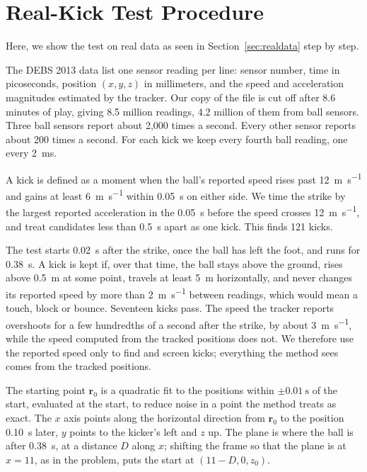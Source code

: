 \documentclass[10pt,a4paper]{article}
\begin{document}
\section{Real-Kick Test Procedure}
\label{app:realdata}

Here, we show the test on real data as seen in Section~\ref{sec:realdata} step by step.

The DEBS 2013 data \citep{debs2013} list one sensor reading
per line: sensor number, time in picoseconds, position $(x, y, z)$ in
millimeters, and the speed and acceleration magnitudes estimated by the
tracker. Our copy of the file is cut off after 8.6 minutes of play, giving
8.5 million readings, 4.2 million of them from ball sensors. Three ball
sensors report about 2{,}000 times a second. Every other sensor reports
about 200 times a second. For each kick we keep every fourth ball reading,
one every \SI{2}{\milli\second}.

A kick is defined as a moment when the ball's reported speed
rises past \SI{12}{\metre\per\second} and gains at least
\SI{6}{\metre\per\second} within \SI{0.05}{\second} on either side. We time
the strike by the largest reported acceleration in the \SI{0.05}{\second}
before the speed crosses \SI{12}{\metre\per\second}, and treat candidates
less than \SI{0.5}{\second} apart as one kick. This finds 121 kicks.

The test starts \SI{0.02}{\second} after the
strike, once the ball has left the foot, and runs for \SI{0.38}{\second}. A
kick is kept if, over that time, the ball stays above the ground, rises
above \SI{0.5}{\metre} at some point, travels at least \SI{5}{\metre}
horizontally, and never changes its reported speed by more than
\SI{2}{\metre\per\second} between readings, which would mean a touch, block
or bounce. Seventeen kicks pass. The speed the tracker reports overshoots
for a few hundredths of a second after the strike, by about
\SI{3}{\metre\per\second}, while the speed computed from the tracked
positions does not. We therefore use the reported speed only to find and
screen kicks; everything the method sees comes from the tracked positions.

The starting point $\bm{r}_0$ is a quadratic fit to
the positions within $\pm\SI{0.01}{\second}$ of the start, evaluated at the
start, to reduce noise in a point the method treats as exact. The $x$ axis
points along the horizontal direction from $\bm{r}_0$ to the position
\SI{0.10}{\second} later, $y$ points to the kicker's left and $z$ up. The
plane is where the ball is after \SI{0.38}{\second}, at a distance $D$ along
$x$; shifting the frame so that the plane is at $x = 11$, as in the problem,
puts the start at $(11 - D, 0, z_0)$.
\end{document}
